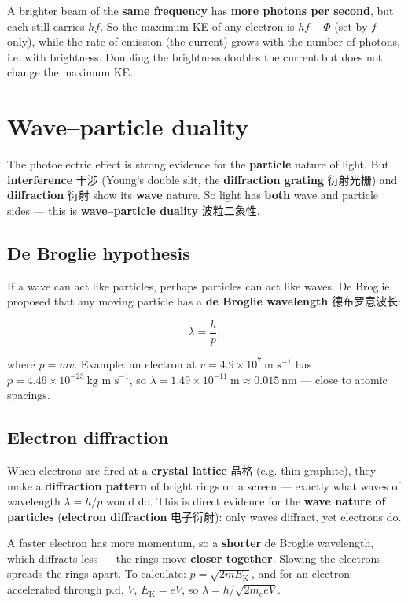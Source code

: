 \documentclass[11pt]{article}
\begin{document}
A brighter beam of the \textbf{same frequency} has \textbf{more photons per second}, but each still carries $hf$. So the maximum KE of any electron is $hf - \Phi$ (set by $f$ only), while the rate of emission (the current) grows with the number of photons, i.e. with brightness. Doubling the brightness doubles the current but does not change the maximum KE.

\section*{Wave–particle duality}

The photoelectric effect is strong evidence for the \textbf{particle} nature of light. But \textbf{interference} 干涉 (Young's double slit, the \textbf{diffraction grating} 衍射光栅) and \textbf{diffraction} 衍射 show its \textbf{wave} nature. So light has \textbf{both} wave and particle sides — this is \textbf{wave–particle duality} 波粒二象性.

\subsection*{De Broglie hypothesis}

If a wave can act like particles, perhaps particles can act like waves. De Broglie proposed that any moving particle has a \textbf{de Broglie wavelength} 德布罗意波长:

\[
\lambda = \frac{h}{p},
\]

where $p = mv$. Example: an electron at $v = 4.9 \times 10^{7}\ \text{m s}^{-1}$ has $p = 4.46 \times 10^{-23}\ \text{kg m s}^{-1}$, so $\lambda = 1.49 \times 10^{-11}\ \text{m} \approx 0.015\ \text{nm}$ — close to atomic spacings.

\subsection*{Electron diffraction}

When electrons are fired at a \textbf{crystal lattice} 晶格 (e.g. thin graphite), they make a \textbf{diffraction pattern} of bright rings on a screen — exactly what waves of wavelength $\lambda = h/p$ would do. This is direct evidence for the \textbf{wave nature of particles} (\textbf{electron diffraction} 电子衍射): only waves diffract, yet electrons do.

A faster electron has more momentum, so a \textbf{shorter} de Broglie wavelength, which diffracts less — the rings move \textbf{closer together}. Slowing the electrons spreads the rings apart. To calculate: $p = \sqrt{2 m E_{\text{K}}}$, and for an electron accelerated through p.d. $V$, $E_{\text{K}} = eV$, so $\lambda = h/\sqrt{2m_{e} e V}$.
\end{document}
